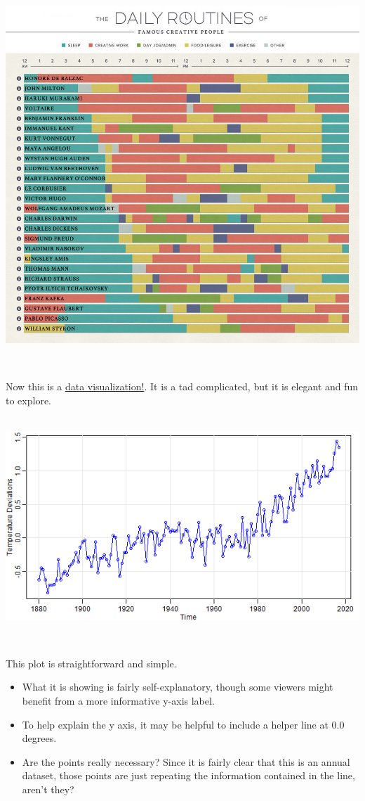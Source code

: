 \documentclass[
]{book}
\providecommand{\tightlist}{%
  \setlength{\itemsep}{0pt}\setlength{\parskip}{0pt}}
\begin{document}
~\\

\includegraphics{img/vis-routines.jpeg}

~

Now this is a \href{https://podio.com/site/creative-routines}{data visualization!}. It is a tad complicated, but it is elegant and fun to explore.

~\\

\includegraphics{img/visi.png}

~

This plot is straightforward and simple.

\begin{itemize}
\tightlist
\item
  What it is showing is fairly self-explanatory, though some viewers might benefit from a more informative y-axis label.
\item
  To help explain the y axis, it may be helpful to include a helper line at 0.0 degrees.\\
\item
  Are the points really necessary? Since it is fairly clear that this is an annual dataset, those points are just repeating the information contained in the line, aren't they?
\end{itemize}
\end{document}
